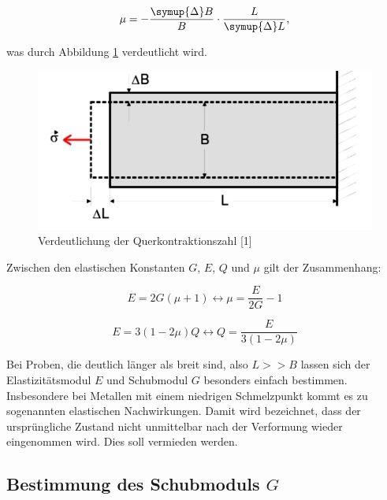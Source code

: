 \begin{equation*}
\mu = -\frac{\symup{\Delta}B}{B}\cdot \frac{L}{\symup{\Delta}L},
\end{equation*}

was durch Abbildung \ref{fig:Mu} verdeutlicht wird. 


\begin{figure}
  \centering
  \includegraphics[scale=0.3]{content/Mu.png}
  \caption{Verdeutlichung der Querkontraktionszahl [1]}
  \label{fig:Mu}
\end{figure}

Zwischen den elastischen Konstanten $G$, $E$, $Q$ und $\mu$ gilt
der Zusammenhang: 

\begin{equation}
E = 2G(\mu +1) \leftrightarrow \mu = \frac{E}{2G} - 1
\label{eqn:Mu}
\end{equation}

\begin{equation}
E = 3(1-2\mu)Q \leftrightarrow Q = \frac{E}{3(1-2\mu)}
\label{eqn:Q}
\end{equation}

Bei Proben, die deutlich länger als breit sind, also $L>>B$ lassen sich der 
Elastizitätsmodul $E$ und Schubmodul $G$ besonders einfach bestimmen. Insbesondere
bei Metallen mit einem niedrigen Schmelzpunkt kommt es zu sogenannten 
elastischen Nachwirkungen. Damit wird bezeichnet, dass der ursprüngliche 
Zustand nicht unmittelbar nach der Verformung wieder eingenommen wird. 
Dies soll vermieden werden. 

\subsection{Bestimmung des Schubmoduls $G$}

